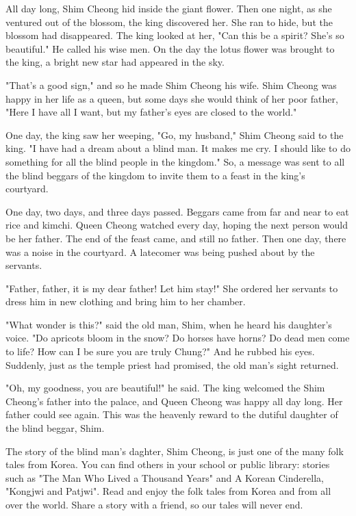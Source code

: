 All day long, Shim Cheong hid inside the giant flower. Then one night, as she ventured out of the blossom, the king discovered her. She ran to hide, but the blossom had disappeared. The king looked at her, "Can this be a spirit? She's so beautiful." He called his wise men. On the day the lotus flower was brought to the king, a bright new star had appeared in the sky.

"That's a good sign," and so he made Shim Cheong his wife. Shim Cheong was happy in her life as a queen, but some days she would think of her poor father, "Here I have all I want, but my father's eyes are closed to the world."

One day, the king saw her weeping, "Go, my husband," Shim Cheong said to the king. "I have had a dream about a blind man. It makes me cry. I should like to do something for all the blind people in the kingdom." So, a message was sent to all the blind beggars of the kingdom to invite them to a feast in the king's courtyard.

One day, two days, and three days passed. Beggars came from far and near to eat rice and kimchi. Queen Cheong watched every day, hoping the next person would be her father. The end of the feast came, and still no father. Then one day, there was a noise in the courtyard. A latecomer was being pushed about by the servants.

"Father, father, it is my dear father! Let him stay!" She ordered her servants to dress him in new clothing and bring him to her chamber.

"What wonder is this?" said the old man, Shim, when he heard his daughter's voice. "Do apricots bloom in the snow? Do horses have horns? Do dead men come to life? How can I be sure you are truly Chung?" And he rubbed his eyes. Suddenly, just as the temple priest had promised, the old man's sight returned.

"Oh, my goodness, you are beautiful!" he said. The king welcomed the Shim Cheong's father into the palace, and Queen Cheong was happy all day long. Her father could see again. This was the heavenly reward to the dutiful daughter of the blind beggar, Shim.

The story of the blind man's daghter, Shim Cheong, is just one of the many folk tales from Korea. You can find others in your school or public library: stories such as "The Man Who Lived a Thousand Years" and A Korean Cinderella, "Kongjwi and Patjwi". Read and enjoy the folk tales from Korea and from all over the world. Share a story with a friend, so our tales will never end.

